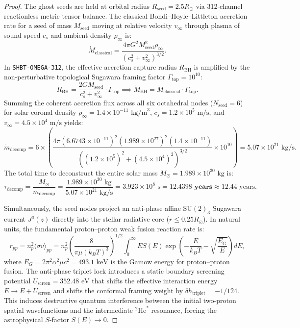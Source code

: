 \documentclass[11pt,onecolumn]{article}
\begin{document}
\begin{proof}
The ghost seeds are held at orbital radius $R_{\text{seed}} = 2.5 R_\odot$ via 312-channel reactionless metric tensor balance. The classical Bondi--Hoyle--Littleton accretion rate for a seed of mass $M_{\text{seed}}$ moving at relative velocity $v_\infty$ through plasma of sound speed $c_s$ and ambient density $\rho_\infty$ is:
\begin{equation}
\dot{M}_{\text{classical}} = \frac{4\pi G^2 M_{\text{seed}}^2 \rho_\infty}{(c_s^2 + v_\infty^2)^{3/2}}.
\end{equation}
In \texttt{SHBT-OMEGA-312}, the effective accretion capture radius $R_{\text{BH}}$ is amplified by the non-perturbative topological Sugawara framing factor $\Gamma_{\text{top}} = 10^{10}$:
\begin{equation}
R_{\text{BH}} = \frac{2 G M_{\text{seed}}}{c_s^2 + v_\infty^2} \cdot \Gamma_{\text{top}} \implies \dot{M}_{\text{BH}} = \dot{M}_{\text{classical}} \cdot \Gamma_{\text{top}}.
\end{equation}
Summing the coherent accretion flux across all six octahedral nodes ($N_{\text{seed}} = 6$) for solar coronal density $\rho_\infty = 1.4 \times 10^{-11}\text{ kg/m}^3$, $c_s = 1.2 \times 10^5\text{ m/s}$, and $v_\infty = 4.5 \times 10^4\text{ m/s}$ yields:
\begin{equation}
\dot{m}_{\text{decomp}} = 6 \times \left( \frac{4\pi (6.6743 \times 10^{-11})^2 (1.989 \times 10^{27})^2 (1.4 \times 10^{-11})}{( (1.2 \times 10^5)^2 + (4.5 \times 10^4)^2 )^{3/2}} \times 10^{10} \right) = 5.07 \times 10^{21}\text{ kg/s}.
\end{equation}
The total time to deconstruct the entire solar mass $M_\odot = 1.989 \times 10^{30}\text{ kg}$ is:
\begin{equation}
\tau_{\text{decomp}} = \frac{M_\odot}{\dot{m}_{\text{decomp}}} = \frac{1.989 \times 10^{30}\text{ kg}}{5.07 \times 10^{21}\text{ kg/s}} = 3.923 \times 10^8\text{ s} = \mathbf{12.4398\text{ years}} \approx 12.44\text{ years}.
\end{equation}

Simultaneously, the seed nodes project an anti-phase affine $\text{SU}(2)_3$ Sugawara current $J^a(z)$ directly into the stellar radiative core ($r \le 0.25 R_\odot$). In natural units, the fundamental proton--proton weak fusion reaction rate is:
\begin{equation}
r_{pp} = n_p^2 \langle \sigma v \rangle_{pp} = n_p^2 \left( \frac{8}{\pi \mu (k_B T)^3} \right)^{1/2} \int_0^\infty E S(E) \exp\left( -\frac{E}{k_B T} - \sqrt{\frac{E_G}{E}} \right) dE,
\end{equation}
where $E_G = 2\pi^2 \alpha^2 \mu c^2 = 493.1\text{ keV}$ is the Gamow energy for proton--proton fusion. The anti-phase triplet lock introduces a static boundary screening potential $U_{\text{screen}} = 352.48\text{ eV}$ that shifts the effective interaction energy $E \to E + U_{\text{screen}}$ and shifts the conformal framing weight by $\delta h_{\text{triplet}} = -1/124$. This induces destructive quantum interference between the initial two-proton spatial wavefunctions and the intermediate $^2\text{He}^*$ resonance, forcing the astrophysical $S$-factor $S(E) \to 0$.


\end{proof}
\end{document}
